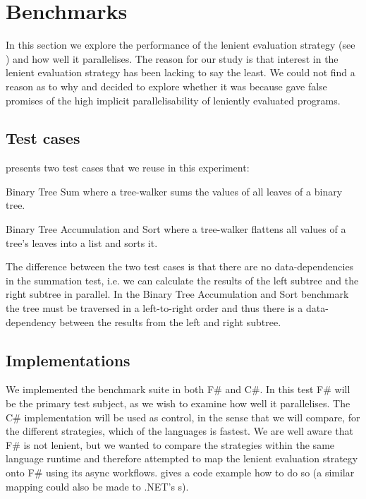 \section{Benchmarks}\label{sec:benchmarks}
In this section we explore the performance of the lenient evaluation strategy (see ) and how well it parallelises. The reason for our study is that interest in the lenient evaluation strategy has been lacking to say the least. We could not find a reason as to why and decided to explore whether it was because \cite{DBLP:journals/cl/Tremblay-parallel} gave false promises of the high implicit parallelisability of leniently evaluated programs.

\subsection{Test cases}
\cite{DBLP:journals/cl/Tremblay-parallel} presents two test cases that we reuse in this experiment:

\begin{labeling}{\quad\quad}
    \item[Binary Tree Sum] where a tree-walker sums the values of all leaves of a binary tree.
    \item[Binary Tree Accumulation and Sort] where a tree-walker flattens all values of a tree's leaves into a list and sorts it.
\end{labeling}

The difference between the two test cases is that there are no data-dependencies in the summation test, i.e. we can calculate the results of the left subtree and the right subtree in parallel. In the Binary Tree Accumulation and Sort benchmark the tree must be traversed in a left-to-right order and thus there is a data-dependency between the results from the left and right subtree.

\subsection{Implementations}\label{sec:bench-impls}
We implemented the benchmark suite in both F\# and C\#. In this test F\# will be the primary test subject, as we wish to examine how well it parallelises. The C\# implementation will be used as control, in the sense that we will compare, for the different strategies, which of the languages is fastest. We are well aware that F\# is not lenient, but we wanted to compare the strategies within the same language runtime and therefore attempted to map the lenient evaluation strategy onto F\# using its async workflows.  gives a code example how to do so (a similar mapping could also be made to .NET's s).

